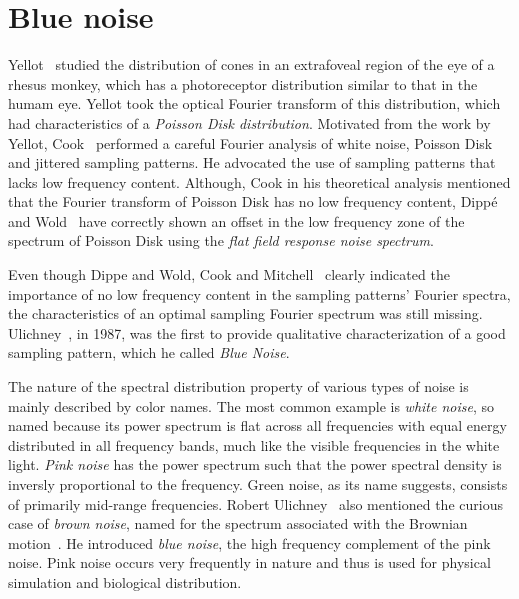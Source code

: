 %
\section{Blue noise}

Yellot~\cite{Ylt83} studied the distribution of cones in an extrafoveal region of the eye of  a 
rhesus monkey, which has a photoreceptor distribution similar to that in the humam eye. Yellot took 
the optical Fourier transform of this distribution, which had characteristics of a \emph{Poisson Disk distribution}. 
Motivated from the work by Yellot, Cook~\cite{Cook:1986:SSC} performed a 
careful Fourier analysis of white noise, Poisson Disk and jittered sampling patterns. 
He advocated the use of sampling patterns that lacks low frequency content. 
Although, Cook in his theoretical analysis mentioned that the Fourier transform of Poisson Disk has 
no low frequency content, Dipp\'{e} and Wold~\cite{Wold85} have correctly shown an offset in the low frequency zone of the spectrum of Poisson Disk using the \emph{flat field response noise spectrum}. 

Even though Dippe and Wold, Cook and Mitchell~\cite{mitchell87a} clearly indicated the importance of no low frequency content in the 
sampling patterns' Fourier spectra, the characteristics of an optimal sampling Fourier spectrum was still missing. Ulichney~\cite{Ulichney:87:halftoning}, in 1987, was the first to provide qualitative 
characterization of a good sampling pattern, which he called \emph{Blue Noise}.


The nature of the spectral distribution property of various types of noise is mainly described by color 
names. The most common example is \emph{white noise}, so named because its power spectrum is 
flat across all frequencies with equal energy distributed in all frequency bands, 
much like the visible frequencies in the white light. \emph{Pink noise} has 
the power spectrum such that the power spectral density is inversly proportional to the frequency. 
Green noise, as its name suggests, consists of primarily mid-range frequencies. 
Robert Ulichney~\cite{Ulichney:87:halftoning} also mentioned the curious case of \emph{brown noise}, named for the spectrum associated 
with the Brownian motion~\cite{gardner1978white}. He introduced \emph{blue noise}, the high 
frequency complement of the pink noise. Pink noise occurs very frequently in nature and thus is used 
for physical simulation and biological distribution.

